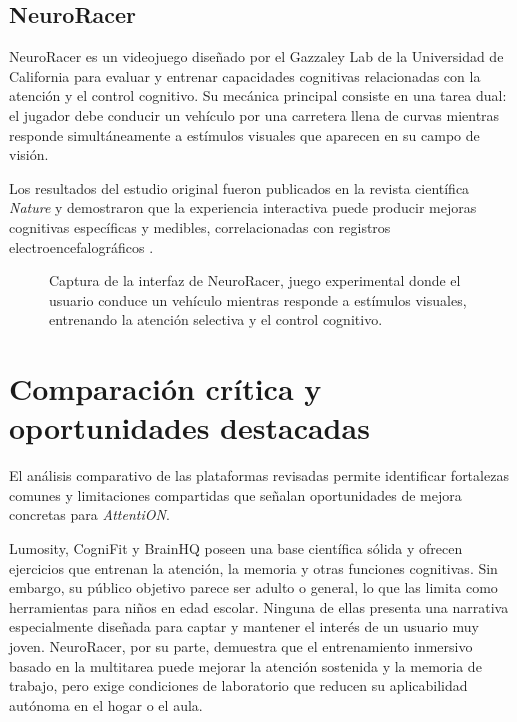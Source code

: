\documentclass[12pt, a4paper]{report}
\begin{document}
\subsection{NeuroRacer}

NeuroRacer es un videojuego diseñado por el Gazzaley Lab de la Universidad de
California para evaluar y entrenar capacidades cognitivas relacionadas con la
atención y el control cognitivo. Su mecánica principal consiste en una tarea
dual: el jugador debe conducir un vehículo por una carretera llena de curvas
mientras responde simultáneamente a estímulos visuales que aparecen en su
campo de visión.

Los resultados del estudio original fueron publicados en la revista científica
\textit{Nature} y demostraron que la experiencia interactiva puede producir
mejoras cognitivas específicas y medibles, correlacionadas con registros
electroencefalográficos \citep{Anguera2013}.

\begin{figure}[H]
  \centering
  \framebox[6cm]{\parbox[c][3cm]{5.5cm}{\centering\small\textcolor{gray}{[Captura: NeuroRacer]}}}
  \caption{Captura de la interfaz de NeuroRacer, juego experimental donde el
    usuario conduce un vehículo mientras responde a estímulos visuales,
    entrenando la atención selectiva y el control cognitivo.}
  \label{fig:neuroracer}
\end{figure}

\section{Comparación crítica y oportunidades destacadas}

El análisis comparativo de las plataformas revisadas permite identificar
fortalezas comunes y limitaciones compartidas que señalan oportunidades de
mejora concretas para \textit{AttentiON}.

Lumosity, CogniFit y BrainHQ poseen una base científica sólida y ofrecen
ejercicios que entrenan la atención, la memoria y otras funciones cognitivas.
Sin embargo, su público objetivo parece ser adulto o general, lo que las limita
como herramientas para niños en edad escolar. Ninguna de ellas presenta una
narrativa especialmente diseñada para captar y mantener el interés de un usuario
muy joven. NeuroRacer, por su parte, demuestra que el entrenamiento inmersivo
basado en la multitarea puede mejorar la atención sostenida y la memoria de
trabajo, pero exige condiciones de laboratorio que reducen su aplicabilidad
autónoma en el hogar o el aula.
\end{document}
